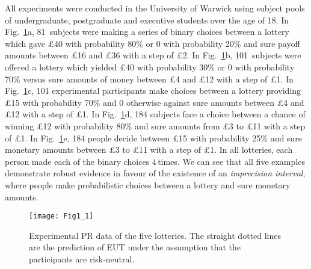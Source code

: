 \documentclass[aps,prl,reprint,superscriptaddress]{revtex4-2}
\begin{document}
All experiments were conducted in the University of Warwick using subject pools of undergraduate, postgraduate and executive students over the age of 18. In Fig.~\ref{Fig1_1}a, 81~subjects were making a series of binary choices between a lottery which gave \pounds40 with probability 80\% or 0 with probability 20\% and sure payoff amounts between \pounds16 and \pounds36 with a step of \pounds2. In Fig.~\ref{Fig1_1}b, 101\, subjects were offered a lottery which yielded \pounds40 with probability 30\% or 0 with probability 70\% versus sure amounts of money between \pounds4 and \pounds12 with a step of \pounds1. In Fig.~\ref{Fig1_1}c, 101 experimental participants make choices between a lottery providing \pounds15 with probability 70\% and 0 otherwise against sure amounts between \pounds4 and \pounds12 with a step of \pounds1. In Fig.~\ref{Fig1_1}d, 184 subjects face a choice between a chance of winning \pounds12 with probability 80\% and sure amounts from \pounds3 to \pounds11 with a step of \pounds1. In Fig.~\ref{Fig1_1}e, 184 people decide between \pounds15 with probability 25\% and sure monetary amounts between \pounds3 to \pounds11 with a step of \pounds1. In all lotteries, each person made each of the binary choices 4\,times. We can see that all five examples demonstrate robust evidence in favour of the existence of an \textit{imprecision interval}, where people make probabilistic choices between a lottery and sure monetary amounts.
\begin{figure}
 \texttt{[image: Fig1\_1]}
 \caption{Experimental PR data of the five lotteries. The straight dotted lines are the prediction of EUT under the assumption that the participants are risk-neutral.\label{Fig1_1}}
\end{figure}
\end{document}
